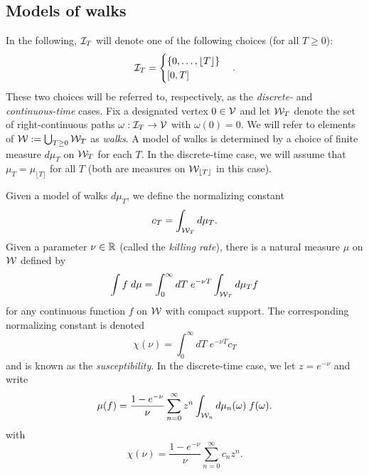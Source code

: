 \subsection{Models of walks}

In the following, $\mathcal{I}_T$ will denote one of the following choices (for all $T \ge 0$):
\begin{equation}
\mathcal{I}_T
  =
\begin{cases}
\{ 0, \ldots, \lfloor T \rfloor \} \\
[0, T]
\end{cases}.
\end{equation}
These two choices will be referred to, respectively, as the \emph{discrete-} and
\emph{continuous-time} cases.
Fix a designated vertex $0 \in \mathcal{V}$ and
let $\mathcal{W}_T$ denote the set of
right-continuous paths $\omega : \mathcal{I}_T \rightarrow \mathcal{V}$ with $\omega(0) = 0$.
We will refer to elements of $\mathcal{W} := \bigcup_{T \geq 0} \mathcal{W}_T$ as \emph{walks}.
A model of walks is determined by a choice of finite measure $d\mu_T$ on
$\mathcal{W}_T$ for each $T$.
In the discrete-time case, we will assume that
$\mu_T = \mu_{\lfloor T \rfloor}$ for all $T$ (both are measures on
$\mathcal{W}_{\lfloor T \rfloor}$ in this case).

Given a model of walks $d\mu_T$, we define the normalizing constant
\begin{equation}
c_T = \int_{\mathcal{W}_T} d\mu_T.
\end{equation}
Given a parameter $\nu \in {\mathbb R}$ (called the \emph{killing rate}),
there is a natural measure $\mu$ on $\mathcal{W}$ defined by
\begin{equation}
\int f \; d\mu
  =
\int_0^\infty dT \; e^{-\nu T} \int_{\mathcal{W}_T} d\mu_T f
\end{equation}
for any continuous function $f$ on $\mathcal{W}$ with compact support.
The corresponding normalizing constant is denoted
\begin{equation}
\chi(\nu) = \int_0^\infty dT \; e^{-\nu T} c_T
\end{equation}
and is known as the \emph{susceptibility}. In the discrete-time case,
we let $z = e^{-\nu}$ and write
\begin{equation}
\mu(f)
  =
\frac{1 - e^{-\nu}}{\nu} \sum_{n=0}^\infty z^n \int_{\mathcal{W}_n} d\mu_n(\omega) \; f(\omega).
\end{equation}
with
\begin{equation}
\chi(\nu) = \frac{1 - e^{-\nu}}{\nu} \sum_{n=0}^\infty c_n z^n.
\end{equation}

